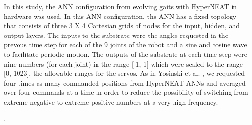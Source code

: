 In this study, the ANN configuration from evolving gaits with HyperNEAT in hardware \cite{yos:clune} was used. 
In this ANN configuration, the ANN has a fixed topology that consists of three 3 X 4 Cartesian grids of nodes for the input, hidden, and output layers. 
The inputs to the substrate were the angles requested in the prevous time step for each of the 9 joints of the robot and a sine and cosine wave to facilitate periodic motion. 
The outputs of the substrate at each time step were nine numbers (for each joint) in the range [-1, 1] which were scaled to the range [0, 1023], the allowable ranges for the servos. 
As in Yosinski et al. \cite{yos:clune}, we requested four times as many commanded positions from HyperNEAT ANNs and averaged over four commands at a time in order to reduce the possibility of switching from extreme negative to extreme positive numbers at a very high frequency. 



.


